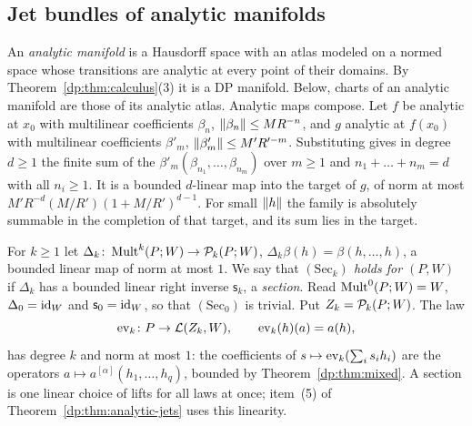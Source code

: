 \subsection{Jet bundles of analytic manifolds}\label{dp:ssec:analytic-jets}

An \emph{analytic manifold} is a Hausdorff space with an atlas modeled on a normed space whose transitions are analytic at every point of their domains. By Theorem~\ref{dp:thm:calculus}(3) it is a DP manifold. Below, charts of an analytic manifold are those of its analytic atlas. Analytic maps compose. Let $f$ be analytic at $x_0$ with multilinear coefficients $\beta_n$, $\lVert \beta_n\rVert\le MR^{-n}$, and $g$ analytic at $f(x_0)$ with multilinear coefficients $\beta'_m$, $\lVert \beta'_m\rVert\le M'R'^{-m}$. Substituting gives in degree $d\ge1$ the finite sum of the $\beta'_m(\beta_{n_1},\dots,\beta_{n_m})$ over $m\ge1$ and $n_1+\dots+n_m=d$ with all $n_i\ge1$. It is a bounded $d$-linear map into the target of $g$, of norm at most $M'R^{-d}(M/R')(1+M/R')^{d-1}$. For small $\lVert h\rVert$ the family is absolutely summable in the completion of that target, and its sum lies in the target.

For $k\ge1$ let $\Delta_k\colon\operatorname{Mult}^k(P;W)\to\mathcal P_k(P;W)$, $\Delta_k\beta(h)=\beta(h,\dots,h)$, a bounded linear map of norm at most $1$. We say that \emph{$(\mathrm{Sec}_k)$ holds for $(P,W)$} if $\Delta_k$ has a bounded linear right inverse $\mathsf s_k$, a \emph{section}. Read $\operatorname{Mult}^0(P;W)=W$, $\Delta_0=\mathrm{id}_W$ and $\mathsf s_0=\mathrm{id}_W$, so that $(\mathrm{Sec}_0)$ is trivial. Put $Z_k=\mathcal P_k(P;W)$. The law
\[
 \operatorname{ev}_k\colon P\to\mathcal L(Z_k,W),\qquad\operatorname{ev}_k(h)(a)=a(h),
\]
has degree $k$ and norm at most $1$: the coefficients of $s\mapsto\operatorname{ev}_k(\sum_is_ih_i)$ are the operators $a\mapsto a^{[\alpha]}(h_1,\dots,h_q)$, bounded by Theorem~\ref{dp:thm:mixed}. A section is one linear choice of lifts for all laws at once; item~(5) of Theorem~\ref{dp:thm:analytic-jets} uses this linearity.

